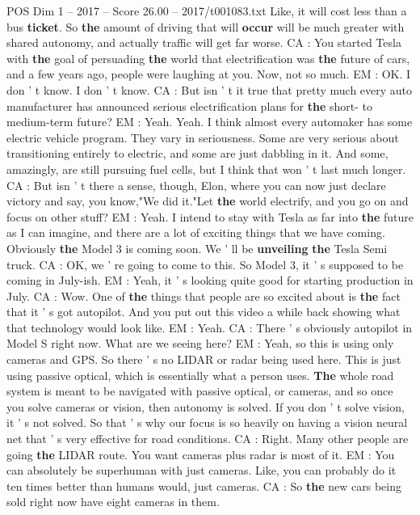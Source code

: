 \begin{textsample}{POS Dim 1 – 2017 – Score 26.00 – 2017/t001083.txt}
Like, it will cost less than a bus \textbf{ticket}.
So \textbf{the} amount of driving that will \textbf{occur} will be much greater with shared autonomy, and actually traffic will get far worse.
CA : You started Tesla with \textbf{the} goal of persuading \textbf{the} world that electrification was \textbf{the} future of cars, and a few years ago, people were laughing at you.
Now, not so much.
EM : OK.
I don ' t know.
I don ' t know.
CA : But isn ' t it true that pretty much every auto manufacturer has announced serious electrification plans for \textbf{the} short- to medium-term future?
EM : Yeah.
Yeah.
I think almost every automaker has some electric vehicle program.
They vary in seriousness.
Some are very serious about transitioning entirely to electric, and some are just dabbling in it.
And some, amazingly, are still pursuing fuel cells, but I think that won ' t last much longer.
CA : But isn ' t there a sense, though, Elon, where you can now just declare victory and say, you know,"We did it."Let \textbf{the} world electrify, and you go on and focus on other stuff?
EM : Yeah.
I intend to stay with Tesla as far into \textbf{the} future as I can imagine, and there are a lot of exciting things that we have coming.
Obviously \textbf{the} Model 3 is coming soon.
We ' ll be \textbf{unveiling} \textbf{the} Tesla Semi truck.
CA : OK, we ' re going to come to this.
So Model 3, it ' s supposed to be coming in July-ish.
EM : Yeah, it ' s looking quite good for starting production in July.
CA : Wow.
One of \textbf{the} things that people are so excited about is \textbf{the} fact that it ' s got autopilot.
And you put out this video a while back showing what that technology would look like.
EM : Yeah.
CA : There ' s obviously autopilot in Model S right now.
What are we seeing here?
EM : Yeah, so this is using only cameras and GPS.
So there ' s no LIDAR or radar being used here.
This is just using passive optical, which is essentially what a person uses. \textbf{The} whole road system is meant to be navigated with passive optical, or cameras, and so once you solve cameras or vision, then autonomy is solved.
If you don ' t solve vision, it ' s not solved.
So that ' s why our focus is so heavily on having a vision neural net that ' s very effective for road conditions.
CA : Right.
Many other people are going \textbf{the} LIDAR route.
You want cameras plus radar is most of it.
EM : You can absolutely be superhuman with just cameras.
Like, you can probably do it ten times better than humans would, just cameras.
CA : So \textbf{the} new cars being sold right now have eight cameras in them.

\end{textsample}
